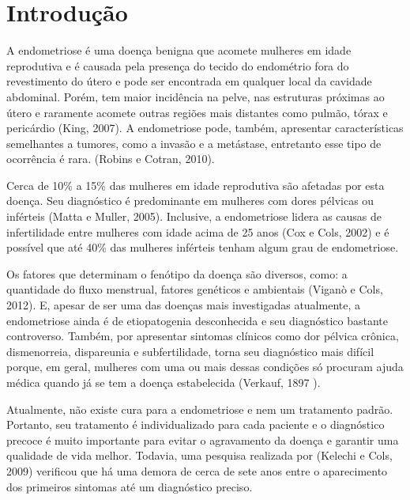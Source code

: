 \documentclass[12pt]{article} %
\begin{document}

\newpage


\section{Introdução}

A endometriose é uma doença benigna que acomete mulheres em idade
reprodutiva e é causada pela presença do tecido do endométrio fora do
revestimento do útero e pode ser encontrada em qualquer local da
cavidade abdominal. Porém, tem maior incidência na pelve, nas
estruturas próximas ao útero e raramente acomete outras regiões mais
distantes como pulmão, tórax e pericárdio (King, 2007). A endometriose
pode, também, apresentar características semelhantes a tumores, como a
invasão e a metástase, entretanto esse tipo de ocorrência é
rara. (Robins e Cotran, 2010).

Cerca de 10\% a 15\% das mulheres em idade reprodutiva são afetadas
por esta doença. Seu diagnóstico é predominante em mulheres com dores
pélvicas ou inférteis (Matta e Muller, 2005).  Inclusive, a
endometriose lidera as causas de infertilidade entre mulheres com
idade acima de 25 anos (Cox e Cols, 2002) e é possível que até 40\%
das mulheres inférteis tenham algum grau de endometriose.

Os fatores que determinam o fenótipo da doença são diversos, como: a
quantidade do fluxo menstrual, fatores genéticos e ambientais (Viganò
e Cols, 2012). E, apesar de ser uma das doenças mais investigadas
atualmente, a endometriose ainda é de etiopatogenia desconhecida e seu
diagnóstico bastante controverso. Também, por apresentar sintomas
clínicos como dor pélvica crônica, dismenorreia, dispareunia e
subfertilidade, torna seu diagnóstico mais difícil porque, em geral,
mulheres com uma ou mais dessas condições só procuram ajuda médica
quando já se tem a doença estabelecida (Verkauf, 1897 ). 

Atualmente, não existe cura para a endometriose e nem um tratamento
padrão. Portanto, seu tratamento é individualizado para cada paciente
e o diagnóstico precoce é muito importante para evitar o agravamento
da doença e garantir uma qualidade de vida melhor.  Todavia, uma
pesquisa realizada por (Kelechi e Cols, 2009) verificou que há uma
demora de cerca de sete anos entre o aparecimento dos primeiros
sintomas até um diagnóstico preciso.
\end{document}
